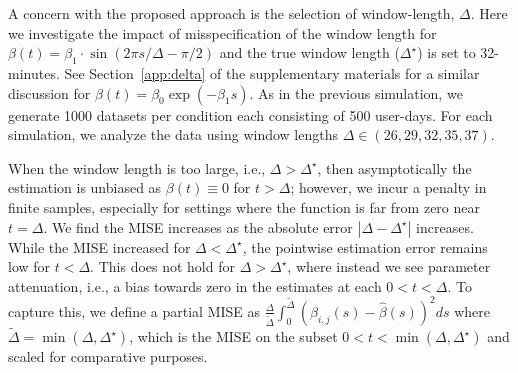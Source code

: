 \documentclass[12pt]{amsart}
\begin{document}
A concern with the proposed approach is the selection of window-length, $\Delta$.  Here we investigate the impact of misspecification of the window length for $\beta(t) = \beta_1 \cdot \sin \left( 2 \pi s / \Delta - \pi /2 \right)$ and the true window length ($\Delta^\star$) is set to 32-minutes.  See Section~\ref{app:delta} of the supplementary materials for a similar discussion for $\beta(t) = \beta_0 \exp \left( - \beta_1 s \right)$.  As in the previous simulation, we generate 1000 datasets per condition each consisting of 500 user-days.  For each simulation, we analyze the data using window lengths $\Delta \in (26,29,32,35,37)$.

When the window length is too large, i.e., $\Delta > \Delta^\star$, then asymptotically the estimation is unbiased as $\beta(t) \equiv 0$ for $t > \Delta$; however, we incur a penalty in finite samples, especially for settings where the function is far from zero near $t = \Delta$.  We find the MISE increases as the absolute error $|\Delta - \Delta^\star|$ increases.  While the MISE increased for $\Delta < \Delta^\star$, the pointwise estimation error remains low for $t < \Delta$.  This does not hold for $\Delta > \Delta^\star$, where instead we see parameter attenuation, i.e., a bias towards zero in the estimates at each $0 < t< \Delta$.  To capture this, we define a partial MISE as $\frac{\Delta}{\tilde \Delta} \int_0^{\tilde \Delta} ( \hat \beta_{i,j} (s) - \hat \beta (s) )^2 ds$ where $\tilde \Delta = \min(\Delta, \Delta^\star)$, which is the MISE on the subset $0<t< \min (\Delta, \Delta^\star)$ and scaled for comparative purposes.
\end{document}
